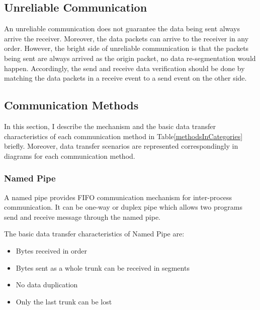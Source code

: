 \subsection{Unreliable Communication}\label{unreliable}
An unreliable communication does not guarantee the data being sent always arrive the receiver. Moreover, the data packets can arrive to the receiver in any order. However, the bright side of unreliable communication is that the packets being sent are always arrived as the origin packet, no data re-segmentation would happen. Accordingly, the send and receive data verification should be done by matching the data packets in a receive event to a send event on the other side.

\subsection{Communication Methods}
In this section, I describe the mechanism and the basic data transfer characteristics of each communication method in Table\ref{methodsInCategories} briefly. Moreover, data transfer scenarios are represented correspondingly in diagrams for each communication method. 
 
\subsubsection{Named Pipe}
A named pipe provides FIFO communication mechanism for inter-process communication. It can be one-way or duplex pipe which allows two programs send and receive message through the named pipe. \cite{khambattinamed}

The basic data transfer characteristics of Named Pipe are:
\begin{itemize}
  \item Bytes received in order
  \item Bytes sent as a whole trunk can be received in segments
  \item No data duplication
  \item Only the last trunk can be lost
\end{itemize}

